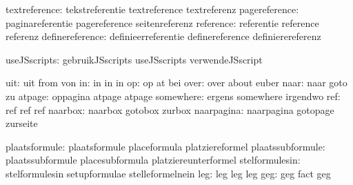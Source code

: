                 textreference:  tekstreferentie              textreference
                                textreferenz
                pagereference:  paginareferentie             pagereference
                                seitenreferenz
                    reference:  referentie                   reference
                                referenz
              definereference:  definieerreferentie          definereference
                                definierereferenz

                 useJSscripts:  gebruikJSscripts             useJSscripts
                                verwendeJSscript

                          uit:  uit                          from
                                von
                           in:  in                           in
                                in
                           op:  op                           at
                                bei
                         over:  over                         about
                                euber
                         naar:  naar                         goto
                                zu
                       atpage:  oppagina                     atpage
                                atpage %
                    somewhere:  ergens                       somewhere
                                irgendwo
                          ref:  ref                          ref
                                ref
                      naarbox:  naarbox                      gotobox
                                zurbox
                   naarpagina:  naarpagina                   gotopage
                                zurseite %

                plaatsformule:  plaatsformule                placeformula
                                platziereformel
             plaatssubformule:  plaatssubformule             placesubformula
                                platziereunterformel
               stelformulesin:  stelformulesin               setupformulae
                                stelleformelnein
                           leg: leg                          leg 
                                leg
                           geg: geg                          fact 
                                geg

